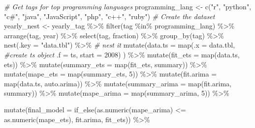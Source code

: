 \documentclass[
]{article}
\newenvironment{Shaded}{\begin{snugshade}}{\end{snugshade}}
\newcommand{\AttributeTok}[1]{\textcolor[rgb]{0.77,0.63,0.00}{#1}}
\newcommand{\CommentTok}[1]{\textcolor[rgb]{0.56,0.35,0.01}{\textit{#1}}}
\newcommand{\DecValTok}[1]{\textcolor[rgb]{0.00,0.00,0.81}{#1}}
\newcommand{\FunctionTok}[1]{\textcolor[rgb]{0.00,0.00,0.00}{#1}}
\newcommand{\NormalTok}[1]{#1}
\newcommand{\OtherTok}[1]{\textcolor[rgb]{0.56,0.35,0.01}{#1}}
\newcommand{\SpecialCharTok}[1]{\textcolor[rgb]{0.00,0.00,0.00}{#1}}
\newcommand{\StringTok}[1]{\textcolor[rgb]{0.31,0.60,0.02}{#1}}
\begin{document}
\begin{Shaded}
\begin{Highlighting}[]
\CommentTok{\# Get tags for top programming languages}
\NormalTok{programming\_lang }\OtherTok{\textless{}{-}} \FunctionTok{c}\NormalTok{(}\StringTok{"r"}\NormalTok{, }\StringTok{"python"}\NormalTok{, }\StringTok{"c\#"}\NormalTok{, }\StringTok{"java"}\NormalTok{, }\StringTok{"JavaScript"}\NormalTok{, }\StringTok{"php"}\NormalTok{, }\StringTok{"c++"}\NormalTok{, }\StringTok{"ruby"}\NormalTok{)}
\CommentTok{\# Create the dataset}
\NormalTok{yearly\_nest }\OtherTok{\textless{}{-}} 
\NormalTok{yearly\_tag  }\SpecialCharTok{\%\textgreater{}\%} 
  \FunctionTok{filter}\NormalTok{(tag }\SpecialCharTok{\%in\%}\NormalTok{ programming\_lang) }\SpecialCharTok{\%\textgreater{}\%}
  \FunctionTok{arrange}\NormalTok{(tag, year) }\SpecialCharTok{\%\textgreater{}\%}
  \FunctionTok{select}\NormalTok{(tag, fraction) }\SpecialCharTok{\%\textgreater{}\%} 
  \FunctionTok{group\_by}\NormalTok{(tag) }\SpecialCharTok{\%\textgreater{}\%} 
  \FunctionTok{nest}\NormalTok{(}\AttributeTok{.key =} \StringTok{"data.tbl"}\NormalTok{) }\SpecialCharTok{\%\textgreater{}\%} \CommentTok{\# nest it}
  \FunctionTok{mutate}\NormalTok{(}\AttributeTok{data.ts =} \FunctionTok{map}\NormalTok{(}\AttributeTok{.x    =}\NormalTok{ data.tbl, }\CommentTok{\#create ts object}
                       \AttributeTok{.f    =}\NormalTok{ ts,}
                       \AttributeTok{start =} \DecValTok{2008}\NormalTok{)}
\NormalTok{                       ) }\SpecialCharTok{\%\textgreater{}\%} 
  \FunctionTok{mutate}\NormalTok{(}\AttributeTok{fit\_ets =} \FunctionTok{map}\NormalTok{(data.ts, ets)) }\SpecialCharTok{\%\textgreater{}\%}
  \FunctionTok{mutate}\NormalTok{(}\AttributeTok{summary\_ets =} \FunctionTok{map}\NormalTok{(fit\_ets, summary)) }\SpecialCharTok{\%\textgreater{}\%}
  \FunctionTok{mutate}\NormalTok{(}\AttributeTok{mape\_ets =} \FunctionTok{map}\NormalTok{(summary\_ets, }\DecValTok{5}\NormalTok{)) }\SpecialCharTok{\%\textgreater{}\%} 
  \FunctionTok{mutate}\NormalTok{(}\AttributeTok{fit.arima =} \FunctionTok{map}\NormalTok{(data.ts, auto.arima)) }\SpecialCharTok{\%\textgreater{}\%}
  \FunctionTok{mutate}\NormalTok{(}\AttributeTok{summary\_arima =} \FunctionTok{map}\NormalTok{(fit.arima, summary)) }\SpecialCharTok{\%\textgreater{}\%}
  \FunctionTok{mutate}\NormalTok{(}\AttributeTok{mape\_arima =} \FunctionTok{map}\NormalTok{(summary\_arima, }\DecValTok{5}\NormalTok{)) }\SpecialCharTok{\%\textgreater{}\%} 
  
  \FunctionTok{mutate}\NormalTok{(}\AttributeTok{final\_model =} \FunctionTok{if\_else}\NormalTok{(}\FunctionTok{as.numeric}\NormalTok{(mape\_arima) }\SpecialCharTok{\textless{}=} \FunctionTok{as.numeric}\NormalTok{(mape\_ets), fit.arima, fit\_ets)) }\SpecialCharTok{\%\textgreater{}\%} 
  

\end{Highlighting}
\end{Shaded}
\end{document}
